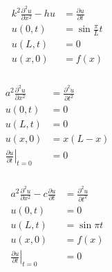 \documentclass{article}
\begin{document}
\setcounter{subsubsection}{4}
\subsubsection{}

\begin{align*}
  k^2 \frac{\partial^2 u}{\partial x^2} - h u & = \frac{\partial u}{\partial t} \\
  u(0, t)                                     & = \sin \frac{\pi}{L} t          \\
  u(L, t)                                     & = 0                             \\
  u(x, 0)                                     & = f(x)
\end{align*}

\setcounter{subsubsection}{6}
\subsubsection{}

\begin{align*}
  a^2 \frac{\partial^2 u}{\partial x^2}                & = \frac{\partial^2 u}{\partial t^2} \\
  u(0, t)                                              & = 0                                 \\
  u(L, t)                                              & = 0                                 \\
  u(x, 0)                                              & = x (L - x)                         \\
  \left. \frac{\partial u}{\partial t} \right|_{t = 0} & = 0
\end{align*}

\setcounter{subsubsection}{8}
\subsubsection{}

\begin{align*}
  a^2 \frac{\partial^2 u}{\partial x^2} - c \frac{\partial u}{\partial t} & = \frac{\partial^2 u}{\partial t^2} \\
  u(0, t)                                                                 & = 0                                 \\
  u(L, t)                                                                 & = \sin \pi t                        \\
  u(x, 0)                                                                 & = f(x)                              \\
  \left. \frac{\partial u}{\partial t} \right|_{t = 0}                    & = 0
\end{align*}
\end{document}
